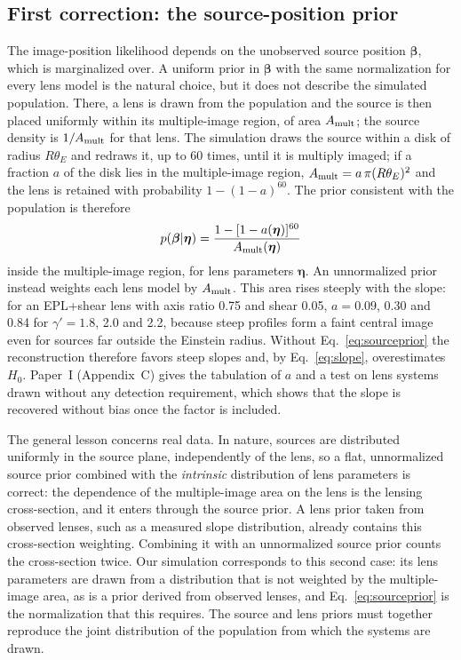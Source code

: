 \subsection{First correction: the source-position prior}
\label{sec:sourceprior}
The image-position likelihood depends on the unobserved source position $\boldsymbol\beta$, which is marginalized over. A uniform prior in $\boldsymbol\beta$ with the same normalization for every lens model is the natural choice, but it does not describe the simulated population. There, a lens is drawn from the population and the source is then placed uniformly within its multiple-image region, of area $A_{\rm mult}$; the source density is $1/A_{\rm mult}$ for that lens. The simulation draws the source within a disk of radius $R\theta_E$ and redraws it, up to 60 times, until it is multiply imaged; if a fraction $a$ of the disk lies in the multiple-image region, $A_{\rm mult}=a\,\pi(R\theta_E)^2$ and the lens is retained with probability $1-(1-a)^{60}$. The prior consistent with the population is therefore
\begin{equation}
p(\boldsymbol\beta|\boldsymbol\eta)=\frac{1-[1-a(\boldsymbol\eta)]^{60}}{A_{\rm mult}(\boldsymbol\eta)}
\label{eq:sourceprior}
\end{equation}
inside the multiple-image region, for lens parameters $\boldsymbol\eta$. An unnormalized prior instead weights each lens model by $A_{\rm mult}$. This area rises steeply with the slope: for an EPL+shear lens with axis ratio 0.75 and shear 0.05, $a=0.09$, 0.30 and 0.84 for $\gamma'=1.8$, 2.0 and 2.2, because steep profiles form a faint central image even for sources far outside the Einstein radius. Without Eq.~\eqref{eq:sourceprior} the reconstruction therefore favors steep slopes and, by Eq.~\eqref{eq:slope}, overestimates $H_0$. Paper~I (Appendix~C) gives the tabulation of $a$ and a test on lens systems drawn without any detection requirement, which shows that the slope is recovered without bias once the factor is included.

The general lesson concerns real data. In nature, sources are distributed uniformly in the source plane, independently of the lens, so a flat, unnormalized source prior combined with the \emph{intrinsic} distribution of lens parameters is correct: the dependence of the multiple-image area on the lens is the lensing cross-section, and it enters through the source prior. A lens prior taken from observed lenses, such as a measured slope distribution, already contains this cross-section weighting. Combining it with an unnormalized source prior counts the cross-section twice. Our simulation corresponds to this second case: its lens parameters are drawn from a distribution that is not weighted by the multiple-image area, as is a prior derived from observed lenses, and Eq.~\eqref{eq:sourceprior} is the normalization that this requires. The source and lens priors must together reproduce the joint distribution of the population from which the systems are drawn.

